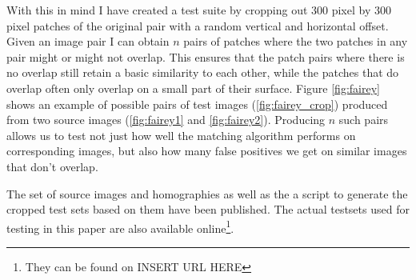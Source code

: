 \documentclass{article}
\begin{document}
With this in mind I have created a test suite by cropping out $300$ 
pixel by $300$ pixel patches of the original pair with a random vertical 
and horizontal offset. Given an image pair I can obtain $n$ pairs of 
patches where the two patches in any pair might or might not overlap.  
This ensures that the patch pairs where there is no overlap still retain 
a basic similarity to each other, while the patches that do overlap 
often only overlap on a small part of their surface. Figure 
\ref{fig:fairey} shows an example of possible pairs of test images 
(\ref{fig:fairey_crop}) produced from two source images 
(\ref{fig:fairey1} and \ref{fig:fairey2}). Producing $n$ such pairs 
allows us to test not just how well the matching algorithm performs on 
corresponding images, but also how many false positives we get on 
similar images that don't overlap.

The set of source images and homographies as well as the a script to 
generate the cropped test sets based on them have been published. The 
actual testsets used for testing in this paper are also available 
online\footnote{They can be found on INSERT URL HERE}.
\end{document}
